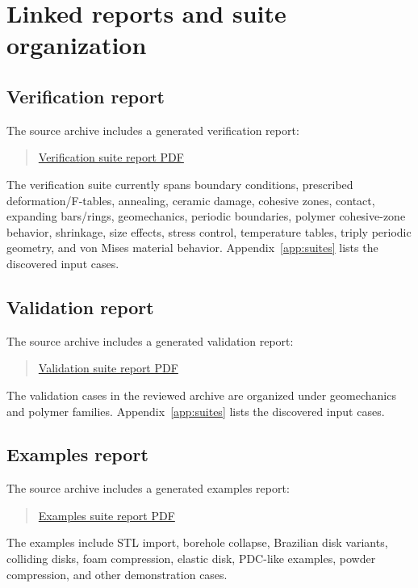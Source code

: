\chapter{Linked reports and suite organization}
\label{ch:linked-reports}

\section{Verification report}
The source archive includes a generated verification report:
\begin{quote}
\href{linked_reports/verification_suite_report.pdf}{Verification suite report PDF}
\end{quote}
The verification suite currently spans boundary conditions, prescribed deformation/F-tables, annealing, ceramic damage, cohesive zones, contact, expanding bars/rings, geomechanics, periodic boundaries, polymer cohesive-zone behavior, shrinkage, size effects, stress control, temperature tables, triply periodic geometry, and von Mises material behavior.  Appendix~\ref{app:suites} lists the discovered input cases.

\section{Validation report}
The source archive includes a generated validation report:
\begin{quote}
\href{linked_reports/validation_suite_report.pdf}{Validation suite report PDF}
\end{quote}
The validation cases in the reviewed archive are organized under geomechanics and polymer families.  Appendix~\ref{app:suites} lists the discovered input cases.

\section{Examples report}
The source archive includes a generated examples report:
\begin{quote}
\href{linked_reports/examples_suite_report.pdf}{Examples suite report PDF}
\end{quote}
The examples include STL import, borehole collapse, Brazilian disk variants, colliding disks, foam compression, elastic disk, PDC-like examples, powder compression, and other demonstration cases.

